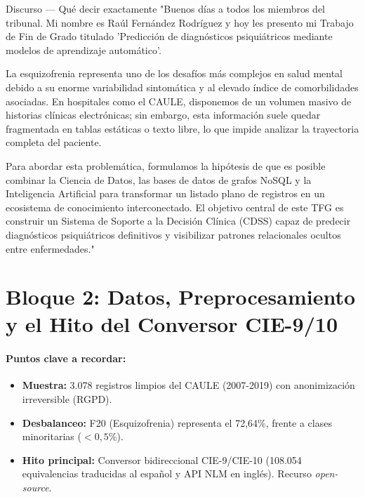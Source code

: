 \documentclass[11pt, a4paper]{article}
\newcommand{\timebadge}[2]{%
  \tcbox[
    on line,
    colback=timeBadge,
    colframe=speechBorder,
    arc=2mm,
    boxrule=0.5pt,
    top=1mm, bottom=1mm, left=2mm, right=2mm
  ]{\small \faClock\ \textbf{#1} \quad \textcolor{gray}{(#2)}}%
}
\begin{document}
\begin{speechbox}{Discurso — Qué decir exactamente}
"Buenos días a todos los miembros del tribunal. Mi nombre es Raúl Fernández Rodríguez y hoy les presento mi Trabajo de Fin de Grado titulado 'Predicción de diagnósticos psiquiátricos mediante modelos de aprendizaje automático'.

La esquizofrenia representa uno de los desafíos más complejos en salud mental debido a su enorme variabilidad sintomática y al elevado índice de comorbilidades asociadas. En hospitales como el CAULE, disponemos de un volumen masivo de historias clínicas electrónicas; sin embargo, esta información suele quedar fragmentada en tablas estáticas o texto libre, lo que impide analizar la trayectoria completa del paciente.

Para abordar esta problemática, formulamos la hipótesis de que es posible combinar la Ciencia de Datos, las bases de datos de grafos NoSQL y la Inteligencia Artificial para transformar un listado plano de registros en un ecosistema de conocimiento interconectado. El objetivo central de este TFG es construir un Sistema de Soporte a la Decisión Clínica (CDSS) capaz de predecir diagnósticos psiquiátricos definitivos y visibilizar patrones relacionales ocultos entre enfermedades."
\end{speechbox}

\newpage

\section{Bloque 2: Datos, Preprocesamiento y el Hito del Conversor CIE-9/10}
\timebadge{1 min 30 s}{Minuto 1:30 - 3:00}

\paragraph{Puntos clave a recordar:}
\begin{itemize}[noitemsep]
    \item \textbf{Muestra:} 3.078 registros limpios del CAULE (2007-2019) con anonimización irreversible (RGPD).
    \item \textbf{Desbalanceo:} F20 (Esquizofrenia) representa el 72,64\%, frente a clases minoritarias ($<0,5\%$).
    \item \textbf{Hito principal:} Conversor bidireccional CIE-9/CIE-10 (108.054 equivalencias traducidas al español y API NLM en inglés). Recurso \textit{open-source}.
\end{itemize}
\end{document}
